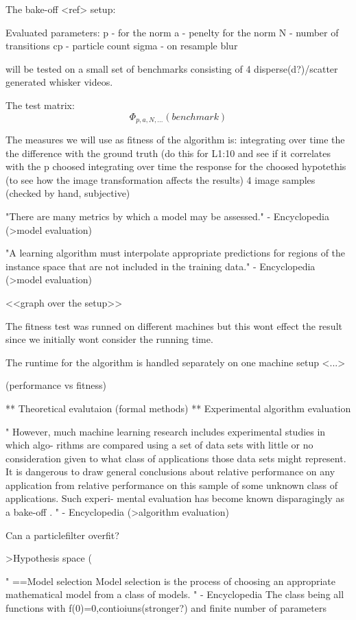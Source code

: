 
The bake-off <ref> setup:

Evaluated parameters:
    p     - for the norm
    a     - penelty for the norm
    N     - number of transitions
    cp    - particle count
    sigma - on resample blur

will be tested on a small set of benchmarks consisting of 4 disperse(d?)/scatter generated whisker videos.

The test matrix:
\begin{equation}
    \Phi_{p,a,N,...}(benchmark)
\end{equation}

The measures we will use as fitness of the algorithm is:
    integrating over time the the difference with the ground truth (do this for L{1:10} and see if it correlates with the p choosed
    integrating over time the response for the choosed hypotethis (to see how the image transformation affects the results)
    4 image samples (checked by hand, subjective)


"There are many metrics by which a model may be assessed." - Encyclopedia
(>model evaluation)

"A learning algorithm must interpolate appropriate predictions for regions of
the instance space that are not included in the training data." - Encyclopedia
(>model evaluation)

<<graph over the setup>>

The fitness test was runned on different machines but this wont effect the
result since we initially wont consider the running time.

The runtime for the algorithm is handled separately on one machine setup <...>




(performance vs fitness)

** Theoretical evalutaion (formal methods)
** Experimental algorithm evaluation 


"
However, much machine learning
research includes experimental studies in which algo-
rithms are compared using a set of data sets with little
or no consideration given to what class of applications
those data sets might represent. It is dangerous to draw
general conclusions about relative performance on any
application from relative performance on this sample
of some unknown class of applications. Such experi-
mental evaluation has become known disparagingly as
a bake-off .
" - Encyclopedia (>algorithm evaluation)



Can a particlefilter overfit?


>Hypothesis space (

"
==Model selection
Model selection is the process of choosing an appropriate mathematical model
from a class of models.
" - Encyclopedia 
The class being all functions with f(0)=0,contioiuns(stronger?) and finite number of parameters


